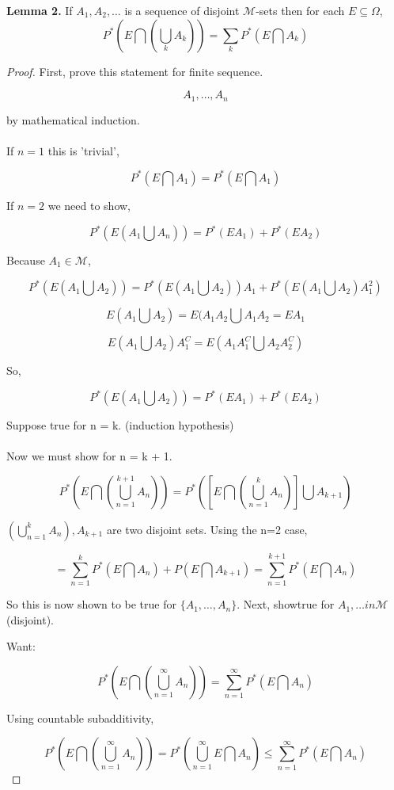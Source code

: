 \documentclass[11pt,fleqn]{book} %
\begin{document}
\textbf{Lemma 2.} If $A_1, A_2, \dots$ is a sequence of disjoint $\mathcal{M}$-sets then for each $E \subseteq \Omega$, 
$$P^*(E\bigcap(\bigcup_k A_k)) = \displaystyle \sum_k P^*(E \bigcap A_k) $$

\begin{proof}
	First, prove this statement for finite sequence. 

	$$A_1, \dots, A_n $$

	by mathematical induction. \\
	\\

	If $n=1$ this is 'trivial', 

	$$P^*(E\bigcap A_1) = P^*(E \bigcap A_1) $$

	If $n = 2$ we need to show, 

	$$ P^*(E  (A_1 \bigcup A_n)) = P^*(E A_1) + P^*(E A_2)$$

	Because $A_1 \in \mathcal{M}$, 

	$$P^*(E(A_1 \bigcup A_2)) = P^*(E(A_1 \bigcup A_2)) A_1 + P^*(E(A_1 \bigcup A_2)A_1^2)  $$

	$$E(A_1 \bigcup A_2) = E(A_1 A_2 \bigcup A_1 A_2 = EA_1$$

	$$E(A_1 \bigcup A_2) A_1^C = E(A_1 A_1^C \bigcup A_2 A_2^C)$$

	So, 

	$$P^*(E(A_1 \bigcup A_2)) = P^*(EA_1) + P^*(EA_2)$$

Suppose true for n = k. (induction hypothesis) \\
\\
Now we must show for n = k + 1.

$$P^* (E \bigcap (\bigcup_{n=1}^{k+1} A_n)) = P^*([E \bigcap (\bigcup_{n=1}^{k} A_n)] \bigcup A_{k+1}) $$

$ (\bigcup_{n=1}^{k} A_n), A_{k+1}$ are two disjoint sets. Using the n=2 case, 

$$ = \displaystyle \sum_{n=1}^k P^*(E \bigcap A_n) + P(E \bigcap A_{k+1}) = \displaystyle \sum_{n=1}^{k+1} P^*(E \bigcap A_n)  $$

So this is now shown to be true for $\{A_1, \dots, A_n \}$. Next, showtrue for $A_1, \dots in \mathcal{M}$ (disjoint).

Want: 

$$P^*(E \bigcap (\bigcup_{n=1}^\infty A_n)) = \displaystyle \sum_{n=1}^{\infty} P^*(E \bigcap A_n)  $$

Using countable subadditivity, 

$$ P^*(E \bigcap (\bigcup_{n=1}^\infty A_n)) = P^*(\displaystyle \bigcup_{n=1}^{\infty} E \bigcap A_n) \leq \displaystyle \sum_{n=1}^{\infty} P^*(E \bigcap A_n)$$


\end{proof}
\end{document}
